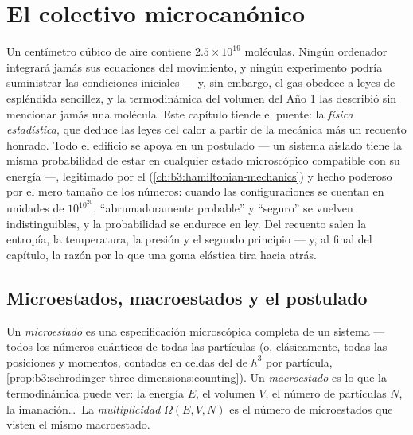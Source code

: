 \chapter{El colectivo microcanónico}\label{ch:b3:microcanonical-ensemble}

Un centímetro cúbico de aire contiene $2.5\times10^{19}$ moléculas. Ningún
ordenador integrará jamás sus ecuaciones del movimiento, y ningún
experimento podría suministrar las condiciones iniciales --- y, sin embargo,
el gas obedece a leyes de espléndida sencillez, y la termodinámica del
volumen del Año 1 las describió sin mencionar jamás una molécula. Este
capítulo tiende el puente: la \emph{física estadística}, que deduce las
leyes del calor a partir de la mecánica más un recuento honrado. Todo el
edificio se apoya en un postulado --- un sistema aislado tiene la misma
probabilidad de estar en cualquier estado microscópico compatible con su
energía ---, legitimado por el 
(\cref{ch:b3:hamiltonian-mechanics}) y hecho poderoso por el mero tamaño de
los números: cuando las configuraciones se cuentan en unidades de
$10^{10^{20}}$, ``abrumadoramente probable'' y ``seguro'' se vuelven
indistinguibles, y la probabilidad se endurece en ley. Del recuento salen la
entropía, la temperatura, la presión y el segundo principio --- y, al final
del capítulo, la razón por la que una goma elástica tira hacia atrás.

\section{Microestados, macroestados y el postulado}

\begin{definition}\label{def:b3:microcanonical-ensemble:states}
Un \emph{microestado} es una especificación microscópica completa de un
sistema --- todos los números cuánticos de todas las partículas (o,
clásicamente, todas las posiciones y momentos, contados en celdas del
 de $h^3$ por partícula,
\cref{prop:b3:schrodinger-three-dimensions:counting}).
Un \emph{macroestado} es lo que la termodinámica puede ver: la energía $E$,
el volumen $V$, el número de partículas $N$, la imanación\dots\ La
\emph{multiplicidad} $\Omega(E, V, N)$ es el número de microestados
que visten el mismo macroestado.
\end{definition}

